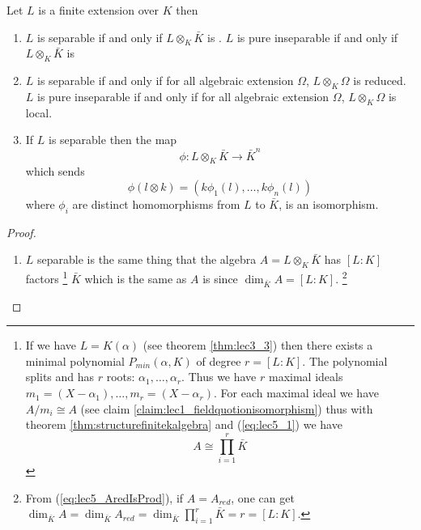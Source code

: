 \begin{theorem}
  Let $L$ is a finite extension over $K$ then
  \begin{enumerate}
  \item $L$ is separable if and only if $L \otimes_K \bar{K}$
    is .
    $L$ is pure inseparable if and only if $L \otimes_K \bar{K}$
    is 
  \item $L$ is separable if and only if for all algebraic extension
    $\Omega$, $L \otimes_K \Omega$ is reduced.
    $L$ is pure inseparable if and only if for all algebraic extension
    $\Omega$, $L \otimes_K \Omega$ is local.
  \item If $L$ is separable then the map
    \[
    \phi: L \otimes_K \bar{K} \to \bar{K}^n
    \]
    which sends
    \[
    \phi\left(l \otimes k\right) =
    \left(
    k \phi_1\left(l\right),
    \dots,
    k \phi_n\left(l\right)
    \right)
    \]
    where $\phi_i$ are distinct homomorphisms from $L$ to $\bar{K}$, 
    is an isomorphism.
  \end{enumerate}
  \label{thm:lec5_1}
  \begin{proof}
    \begin{enumerate}
    \item $L$ separable is the same thing that the algebra
      $A = L\otimes_K \bar{K}$ has $\left[L:K\right]$ factors
      \footnote{
        If we have $L = K\left(\alpha\right)$
        (see theorem \ref{thm:lec3_3}) then
        there exists a minimal polynomial $P_{min}\left(\alpha,
        K\right)$ of degree $r = \left[L:K\right]$. The polynomial
        splits and has $r$ roots: $\alpha_1, \dots, \alpha_r$. Thus we
        have $r$ maximal ideals
        \(
        m_1 = \left(X - \alpha_1\right), \dots,
        m_r = \left(X - \alpha_r\right)
        \).
        For each maximal ideal we have $A/m_i \cong A$ (see claim
        \ref{claim:lec1_fieldquotionisomorphism}) thus with theorem
        \ref{thm:structurefinitekalgebra} and (\ref{eq:lec5_1}) we have
        \[
        A \cong \prod_{i=1}^r \bar{K}
        \]
      }
      $\bar{K}$ which is the same as $A$ is 
      since $\dim_{\bar{K}} A = \left[L:K\right]$.
      \footnote{
        From (\ref{eq:lec5_AredIsProd}), if $A = A_{red}$, one can get
        $\dim_{\bar{K}} A = \dim_{\bar{K}} A_{red} = \dim_{\bar{K}}
        \prod_{i = 1}^r \bar{K} = r = \left[L:K\right]$.
      }


\end{enumerate}
\end{proof}
\end{theorem}
